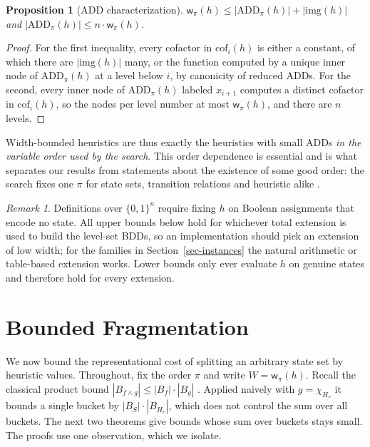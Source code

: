 \documentclass[letterpaper]{article}
\newcommand{\bddsize}[1]{\ensuremath{|B_{#1}|}}
\newcommand{\width}{\ensuremath{\mathsf{w}}}
\newcommand{\level}[2]{\ensuremath{H_{#2}}}
\newcommand{\sub}[2]{\ensuremath{\mathrm{cof}_{#1}(#2)}}
\newcommand{\img}{\ensuremath{\mathrm{img}}}
\theoremstyle{plain}
\newtheorem{proposition}{Proposition}
\theoremstyle{definition}
\theoremstyle{remark}
\newtheorem{remark}{Remark}
\begin{document}
\begin{proposition}[ADD characterization]
\label{prop-add}
$\width_\pi(h) \leq |\mathrm{ADD}_\pi(h)| + |\img(h)|$ and
$|\mathrm{ADD}_\pi(h)| \leq n \cdot \width_\pi(h)$.
\end{proposition}

\begin{proof}
For the first inequality, every cofactor in $\sub{i}{h}$ is either a
constant, of which there are $|\img(h)|$ many, or the function computed
by a unique inner node of $\mathrm{ADD}_\pi(h)$ at a level below $i$, by
canonicity of reduced ADDs. For the second, every inner node of
$\mathrm{ADD}_\pi(h)$ labeled $x_{i+1}$ computes a distinct cofactor in
$\sub{i}{h}$, so the nodes per level number at most $\width_\pi(h)$, and
there are $n$ levels.
\end{proof}

Width-bounded heuristics are thus exactly the heuristics with small ADDs
\emph{in the variable order used by the search}. This order dependence is
essential and is what separates our results from statements about the
existence of some good order: the search fixes one $\pi$ for state sets,
transition relations and heuristic alike
\citep{kissmann-hoffmann-jair2014}.

\begin{remark}
\label{rem-encoding}
Definitions over $\{0,1\}^n$ require fixing $h$ on Boolean assignments
that encode no state. All upper bounds below hold for whichever total
extension is used to build the level-set BDDs, so an implementation
should pick an extension of low width; for the families in
Section~\ref{sec-instances} the natural arithmetic or table-based
extension works. Lower bounds only ever evaluate $h$ on genuine states
and therefore hold for every extension.
\end{remark}

\section{Bounded Fragmentation}
\label{sec-fragmentation}

We now bound the representational cost of splitting an arbitrary state
set by heuristic values. Throughout, fix the order $\pi$ and write
$W = \width_\pi(h)$. Recall the classical product bound
$\bddsize{f \wedge g} \leq \bddsize{f} \cdot \bddsize{g}$
\citep{bryant-ieeecomp1986}. Applied naively with $g = \chi_{\level{h}{v}}$ it
bounds a single bucket by
$\bddsize{S} \cdot \bddsize{\level{h}{v}}$, which does not control the
sum over all buckets. The next two theorems give bounds whose sum over
buckets stays small. The proofs use one observation, which we isolate.
\end{document}
